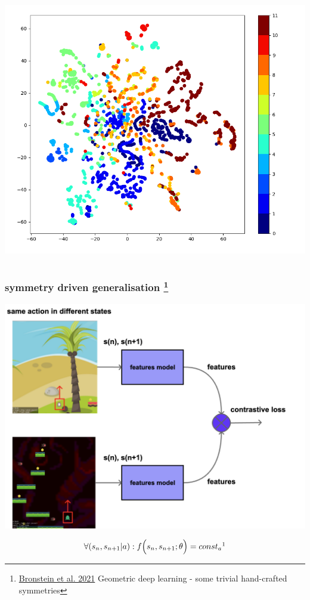 \documentclass{beamer}
\begin{document}
\begin{frame}
\begin{columns}
    \begin{column}{0.5\textwidth}
      \centering
      \includegraphics[scale=0.2]{../images/snd_features.png}
    \end{column}
  
  \end{columns}

\end{frame}

\begin{frame}
  
  \frametitle{symmetry driven generalisation \footnote{\href{https://geometricdeeplearning.com/lectures/}{Bronstein et al. 2021} Geometric deep learning - some trivial hand-crafted symmetries} }

  \centering
  \includegraphics[scale=0.15]{../diagrams/symmetry/basic.png}

  \begin{align*}
    \forall (s_{n},s_{n+1} \vert a) : f \Big( s_{n}, s_{n+1}; \theta \Big) = const_a \footnotemark
  \end{align*} 


   
\end{frame}
\end{document}
